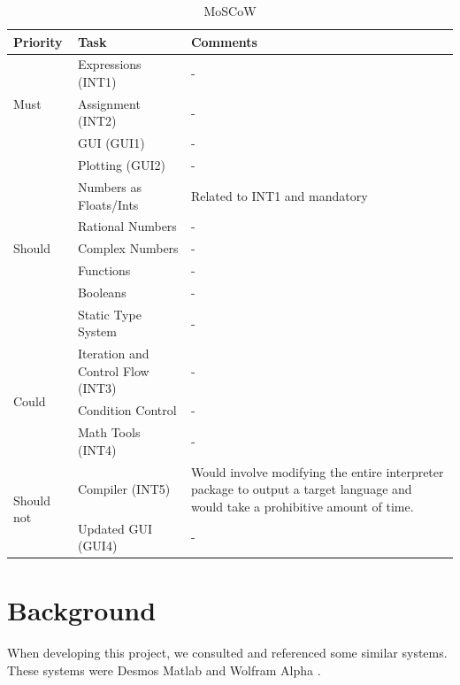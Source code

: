 \documentclass[a4paper, oneside, 11pt]{report}
\begin{document}
\begin{table}[h]
\caption{MoSCoW}
\begin{center}
\begin{tabular}{|p{1in}|p{2in}|p{2.5in}|} \hline
Priority & Task & Comments \\ \hline \hline

\multirow{3}{1in}{Must}
& Expressions (INT1) & - \\ \cline{2-3}
& Assignment (INT2) & - \\ \cline{2-3}
& GUI (GUI1) & - \\ \cline{2-3}
& Plotting (GUI2) & - \\ \cline{2-3}
& Numbers as Floats/Ints & Related to INT1 and mandatory \\ \hline \hline

\multirow{3}{1in}{Should}
& Rational Numbers & - \\ \cline{2-3}
& Complex Numbers & - \\ \cline{2-3}
& Functions & - \\ \cline{2-3}
& Booleans & - \\ \cline{2-3}
& Static Type System & - \\ \hline \hline

\multirow{3}{1in}{Could}
& Iteration and Control Flow (INT3) & - \\ \cline{2-3}
& Condition Control & - \\ \cline{2-3}
& Math Tools (INT4) & - \\ \hline \hline

\multirow{3}{1in}{Should not}
& Compiler (INT5) & Would involve modifying the entire interpreter package to output a target language and would take a prohibitive amount of time. \\ \cline{2-3}
& Updated GUI (GUI4) & - \\ \hline
\end{tabular}
\label{Table1}
\end{center}
\end{table}

\chapter{Background}

When developing this project, we consulted and referenced some similar systems. These systems were Desmos \citep{Desmos:2023} Matlab \citep{Matlab:2023} and Wolfram Alpha \citep{Wolfram-Alpha:2025}. \\
\end{document}
